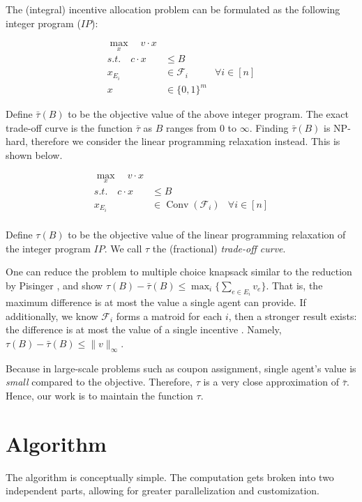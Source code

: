 \documentclass{article}
\newcommand{\ips}{\bar{\tau}}
\newcommand{\lps}{\tau}
\begin{document}
The (integral) incentive allocation problem can be formulated as the following integer program ($IP$):

\[
\begin{aligned}
    \max_x \quad v \cdot x \\
    s.t.   \quad c \cdot x &\leq B & \\
    x_{E_i}&\in \mathcal{F}_i &\forall i\in [n]\\
    x&\in \{0,1\}^m
\end{aligned}
\]

Define $\ips(B)$ to be the objective value of the above integer program. The exact trade-off curve is the function $\ips$ as $B$ ranges from $0$ to $\infty$. Finding $\ips(B)$ is NP-hard, therefore we consider the linear programming relaxation instead. This is shown below. 

\begin{equation}
    \label{eq:generallp}
\begin{aligned}
    \max_x \quad v \cdot x \\
    s.t.   \quad c \cdot x &\leq B & \\
    x_{E_i}&\in \operatorname{Conv}(\mathcal{F}_i) &\forall i\in [n]\\
\end{aligned}
\end{equation}

Define $\lps(B)$ to be the objective value of the linear programming relaxation of the integer program $IP$. We call $\lps$ the (fractional) \emph{trade-off curve}.

One can reduce the problem to multiple choice knapsack similar to the reduction by Pisinger , and show $\lps(B)-\ips(B) \leq \max_i\{ \sum_{e\in E_i} v_e\}$. 
That is, the maximum difference is at most the value a single agent can provide. If additionally, we know $\mathcal{F}_i$ forms a matroid for each $i$, then a stronger result exists: the difference is at most the value of a single incentive \cite{CAMERINI1984157}. Namely, $\lps(B)-\ips(B) \leq \|v\|_\infty$.

Because in large-scale problems such as coupon assignment, single agent's value is \emph{small} compared to the objective. Therefore, $\lps$ is a very close approximation of $\ips$. Hence, our work is to maintain the function $\lps$.

\section{Algorithm}\label{sec:alg}
The algorithm is conceptually simple. The computation gets broken into two independent parts, allowing for greater parallelization and customization. 
\end{document}
